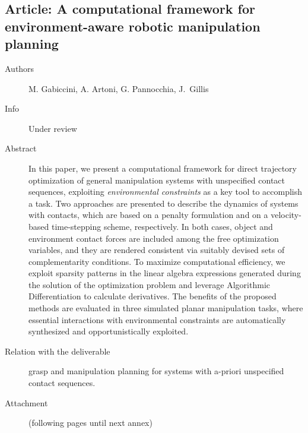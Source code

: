 \documentclass[a4paper,11pt,pdf]{pacmanreport}
\begin{document}
\subsection{Article: A computational framework for environment-aware robotic manipulation planning} \label{ann:env-awareManipulation}
\begin{description}
    \item[Authors] M. Gabiccini, A. Artoni, G. Pannocchia, J.~Gillis
    \item[Info] Under review
    \item[Abstract] In this paper, we present a computational framework for direct trajectory optimization of general manipulation systems with unspecified contact sequences, exploiting \emph{environmental constraints} as a key tool to accomplish a task.
    Two approaches are presented to describe the dynamics of systems with contacts, which are based on a penalty formulation and on a velocity-based time-stepping scheme, respectively. In  both cases, object and environment contact forces are included among the free optimization variables, and they are rendered consistent via suitably devised sets of complementarity conditions.
    To maximize computational efficiency, we exploit sparsity patterns in the linear algebra expressions generated during the solution of the optimization problem and leverage Algorithmic Differentiation to calculate derivatives. %
    The benefits of the proposed methods are evaluated in three simulated planar manipulation tasks, where essential interactions with environmental constraints are automatically synthesized and opportunistically exploited.
    \item[Relation with the deliverable] grasp and manipulation planning for systems with a-priori unspecified contact sequences.
    \item[Attachment] (following pages until next annex)
\end{description}


\end{document}
